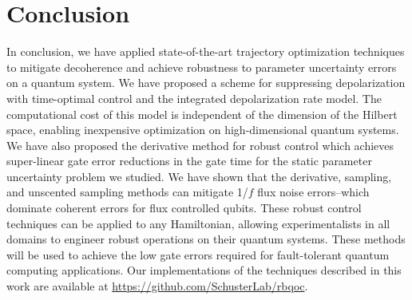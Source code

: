 \section{Conclusion}
In conclusion, we have applied state-of-the-art trajectory
optimization techniques to mitigate decoherence and
achieve robustness to parameter uncertainty
errors on a quantum system.
We have proposed a scheme for suppressing
depolarization with time-optimal
control and the integrated depolarization rate model.
The computational cost of this model is
independent of the dimension of the Hilbert space, enabling
inexpensive optimization on high-dimensional quantum systems.
We have also proposed the derivative method for robust control which achieves
super-linear gate error reductions in the gate time for the static parameter
uncertainty problem we studied.
We have shown that the derivative, sampling, and unscented sampling methods
can mitigate 1/$f$ flux noise errors--which
dominate coherent errors for flux controlled qubits.
These robust control techniques can be applied
to any Hamiltonian,
allowing experimentalists in all domains to engineer robust
operations on their quantum systems.
These methods will be used to achieve the low gate errors
required for fault-tolerant quantum computing applications. Our
implementations of the techniques described in this work are available
at \url{https://github.com/SchusterLab/rbqoc}. 
